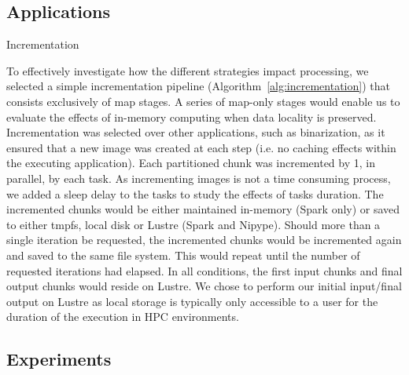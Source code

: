 \subsection{Applications} %
\begin{algorithm2e}\caption{Incrementation}\label{alg:incrementation}
\SetAlgoLined
\end{algorithm2e}

To effectively investigate how the different strategies impact processing, we 
selected a simple incrementation pipeline (Algorithm~\ref{alg:incrementation}) 
that consists exclusively of map 
stages. A series of map-only stages would enable us to evaluate the effects of
in-memory computing when data locality is preserved. Incrementation was 
selected 
over other applications, such as binarization, as it ensured that a new image
was created at each step (i.e. no caching effects within the executing 
application). Each partitioned chunk was incremented by 1, in parallel, by
each task. As incrementing images is not a time consuming process,
we added a sleep delay to the tasks to study the effects 
of tasks duration. The incremented chunks would be either 
maintained in-memory (Spark only) or saved to either tmpfs, local disk or 
Lustre (Spark and Nipype). Should more than a single iteration be requested, 
the incremented chunks would be incremented again and saved to the same file system. 
This would repeat until the number of requested iterations had elapsed. In all 
conditions, the first input chunks and final output chunks would reside on Lustre. 
We chose to perform our initial input/final output on Lustre as local storage is
typically only accessible to a user for the duration of the execution in HPC
environments.

\subsection{Experiments}

